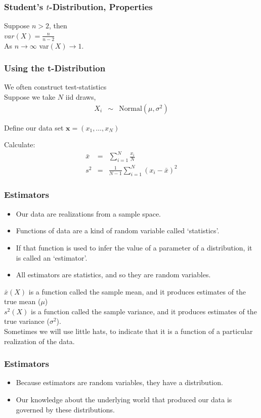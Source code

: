 \documentclass{beamer}
\numberwithin{equation}{section}
\begin{document}
\begin{frame}
\frametitle{Student's $t$-Distribution, Properties}

Suppose $n>2$, then \\
$var(X) = \frac{n}{n-2}$ \\
As $n \rightarrow \infty$ var$(X) \rightarrow 1$.  



\end{frame}



\begin{frame}
\frametitle{Using the t-Distribution}

We often construct \alert{test-statistics}\\
Suppose we take $N$ iid draws, 
\begin{eqnarray}
X_{i} & \sim & \text{Normal}(\mu, \sigma^2) \nonumber 
\end{eqnarray}

Define our data set $\boldsymbol{x} = (x_{1}, \hdots, x_{N})$

Calculate:
\begin{eqnarray}
 \bar{x} & = &  \sum_{i=1}^{N} \frac{x_{i}}{N} \nonumber \\
 s^2 & = & \frac{1}{N-1} \sum_{i=1}^{N} (x_{i} - \bar{x})^2 \nonumber 
\end{eqnarray}

\end{frame}

\begin{frame}
\frametitle{Estimators}
\begin{itemize}
\item Our data are realizations from a sample space.\pause
\item Functions of data are a kind of random variable called `statistics'. \pause  
\item If that function is used to infer the value of a parameter of a distribution, it is called an `estimator'.\pause
\item All estimators are statistics, and so they are random variables.\pause
\end{itemize}
$\bar{x}(X)$ is a function called the sample mean, and it produces estimates of the true mean ($\mu$)\\ \pause
$s^2(X)$ is a function called the sample variance, and it produces estimates of the true variance ($\sigma^2$).\\ \pause
Sometimes we will use little hats, to indicate that it is a function of a particular realization of the data.

\end{frame}
\begin{frame}
\frametitle{Estimators}
\begin{itemize}
\item Because estimators are random variables, they have a distribution.\pause
\item Our knowledge about the underlying world that produced our data is governed by these distributions.
\end{itemize}
\end{frame}
\end{document}

